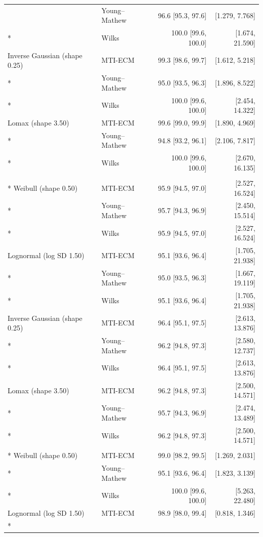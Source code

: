 \begin{longtable}{@{}llrr@{}}
 & Young--Mathew & 96.6 [95.3, 97.6] & [1.279, 7.768] \\*
 & Wilks & 100.0 [99.6, 100.0] & [1.674, 21.590] \\
Inverse Gaussian (shape 0.25) & MTI-ECM & 99.3 [98.6, 99.7] & [1.612, 5.218] \\*
 & Young--Mathew & 95.0 [93.5, 96.3] & [1.896, 8.522] \\*
 & Wilks & 100.0 [99.6, 100.0] & [2.454, 14.322] \\
Lomax (shape 3.50) & MTI-ECM & 99.6 [99.0, 99.9] & [1.890, 4.969] \\*
 & Young--Mathew & 94.8 [93.2, 96.1] & [2.106, 7.817] \\*
 & Wilks & 100.0 [99.6, 100.0] & [2.670, 16.135] \\
\addlinespace[0.4em]
\multicolumn{4}{l}{\textbf{\(n=100, c=0.95, p=0.95\)}} \\*
Weibull (shape 0.50) & MTI-ECM & 95.9 [94.5, 97.0] & [2.527, 16.524] \\*
 & Young--Mathew & 95.7 [94.3, 96.9] & [2.450, 15.514] \\*
 & Wilks & 95.9 [94.5, 97.0] & [2.527, 16.524] \\
Lognormal (log SD 1.50) & MTI-ECM & 95.1 [93.6, 96.4] & [1.705, 21.938] \\*
 & Young--Mathew & 95.0 [93.5, 96.3] & [1.667, 19.119] \\*
 & Wilks & 95.1 [93.6, 96.4] & [1.705, 21.938] \\
Inverse Gaussian (shape 0.25) & MTI-ECM & 96.4 [95.1, 97.5] & [2.613, 13.876] \\*
 & Young--Mathew & 96.2 [94.8, 97.3] & [2.580, 12.737] \\*
 & Wilks & 96.4 [95.1, 97.5] & [2.613, 13.876] \\
Lomax (shape 3.50) & MTI-ECM & 96.2 [94.8, 97.3] & [2.500, 14.571] \\*
 & Young--Mathew & 95.7 [94.3, 96.9] & [2.474, 13.489] \\*
 & Wilks & 96.2 [94.8, 97.3] & [2.500, 14.571] \\
\newpage
\multicolumn{4}{l}{\textbf{\(n=500, c=0.90, p=0.95\)}} \\*
Weibull (shape 0.50) & MTI-ECM & 99.0 [98.2, 99.5] & [1.269, 2.031] \\*
 & Young--Mathew & 95.1 [93.6, 96.4] & [1.823, 3.139] \\*
 & Wilks & 100.0 [99.6, 100.0] & [5.263, 22.480] \\
Lognormal (log SD 1.50) & MTI-ECM & 98.9 [98.0, 99.4] & [0.818, 1.346] \\*

\end{longtable}
